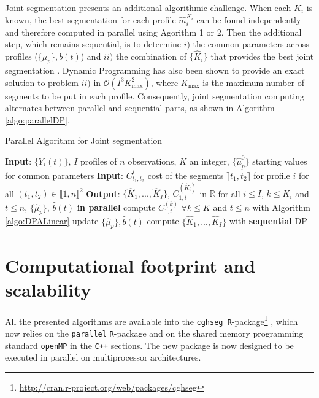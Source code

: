 \documentclass[11pt]{llncs}
\newcommand{\esoft}{\texttt{cghseg }}
\begin{document}
{Joint segmentation presents an additional algorithmic challenge. When each $K_i$ is known, the best segmentation for each profile $\widehat{m}_{i}^{K_i}$ can be found independently and therefore computed in parallel using Agorithm 1 or 2. Then the additional step, which remains sequential, is to determine $i)$ the common parameters across profiles ($\{\mu_p\}, b(t)$) and $ii)$ the combination of $\{\widehat{K}_i\}$ that provides the best joint segmentation \cite{PLH11}. Dynamic Programming has also been shown to provide an exact solution to problem $ii)$ in $\mathcal{O}(I^3 K_{\max}^2)$, where $K_{\max}$ is the maximum number of segments to be put in each profile. Consequently, joint segmentation computing alternates between parallel and sequential parts, as shown in Algorithm \ref{algo:parallelDP}.
\begin{algorithm}
\begin{algorithmic}
\caption{Parallel Algorithm for Joint segmentation}\label{algo:parallelDP}
\State \textbf{Input}: $\{Y_i(t)\}$, $I$ profiles of $n$ observations, $K$ an integer, $\{\widehat{\mu}_p^0\}$ starting values for common parameters
\State \textbf{Input}: $C_{t_1,t_2}^i$ cost of the segments $\rrbracket t_1, t_2 \rrbracket$ for profile $i$ for all $(t_1, t_2) \in \llbracket1, n \rrbracket^2$
\State \textbf{Output}: $\{\widehat{K}_1,..., \widehat{K}_I\}$, $C^{(\widehat{K}_i)}_{1,t}$ in $\mathbb{R}$ for all $i \leq I$, $k \leq K_i$ and $t \leq n$, $\{\widehat{\mu}_p\}$, $\widehat{b}(t)$ 
 {\bf in parallel}
\State compute $C^{(k)}_{1,t}$  $\forall k \leq K$ and $t \leq n$ with Algorithm \ref{algo:DPALinear}
\EndFor
\State update $\{\widehat{\mu}_p\}, \widehat{b}(t)$
\State compute $\{\widehat{K}_1,..., \widehat{K}_I\}$ with {\bf sequential} DP \cite{PLH11}
\EndWhile
  \end{algorithmic}
\end{algorithm}

\section{Computational footprint and scalability}

All the presented algorithms are available into the \esoft \texttt{R}-package\footnote{\url{http://cran.r-project.org/web/packages/cghseg}} , which now relies on the \texttt{parallel} \texttt{R}-package and on the shared memory programming standard \texttt{openMP} in the \texttt{C++} sections. The new package is now designed to be executed in parallel on multiprocessor architectures. 

}
\end{document}
